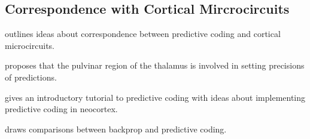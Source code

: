 \subsection{Correspondence with Cortical Mircrocircuits}

\noindent \cite{bastos2012canonical} outlines ideas about correspondence between predictive coding and cortical microcircuits.
\newline

\noindent \cite{kanai2015cerebral} proposes that the pulvinar region of the thalamus is involved in setting precisions of predictions.
\newline

\noindent \cite{bogacz2017tutorial} gives an introductory tutorial to predictive coding with ideas about implementing predictive coding in neocortex.
\newline

\noindent \cite{whittington2017approximation} draws comparisons between backprop and predictive coding.
\newline

